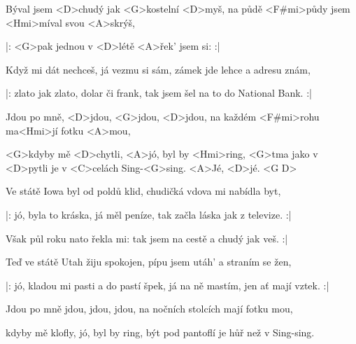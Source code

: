 

\zs
Býval jsem <D>chudý jak <G>kostelní <D>myš,
na půdě <F#mi>půdy jsem <Hmi>míval svou <A>skrýš,

|: <G>pak jednou v <D>létě <A>řek' jsem si:  :|
\ks

\zs
Když mi dát nechceš, já vezmu si sám,
zámek jde lehce a adresu znám,

|: zlato jak zlato, dolar či frank,
tak jsem šel na to do National Bank. :|
\ks

\zr
Jdou po mně, <D>jdou, <G>jdou, <D>jdou,
na každém <F#mi>rohu ma<Hmi>jí fotku <A>mou,

<G>kdyby mě <D>chytli, <A>jó, byl by <Hmi>ring,
<G>tma jako v <D>pytli je v <C>celách Sing-<G>sing. <A>Jé, <D>jé. <G D>
\kr

\zs
Ve státě Iowa byl od poldů klid,
chudičká vdova mi nabídla byt,

|: jó, byla to kráska, já měl peníze,
tak začla láska jak z televize. :|
\ks

\zs
Však půl roku nato řekla mi: 
tak jsem na cestě a chudý jak veš. :|
\ks

\zr \kr

%

\zs
Teď ve státě Utah žiju spokojen,
pípu jsem utáh' a straním se žen,

|: jó, kladou mi pasti a do pastí špek,
já na ně mastím, jen ať mají vztek. :|
\ks

\zr
Jdou po mně jdou, jdou, jdou,
na nočních stolcích mají fotku mou,

kdyby mě klofly, jó, byl by ring,
být pod pantoflí je hůř než v Sing-sing.
\kr

\kp
